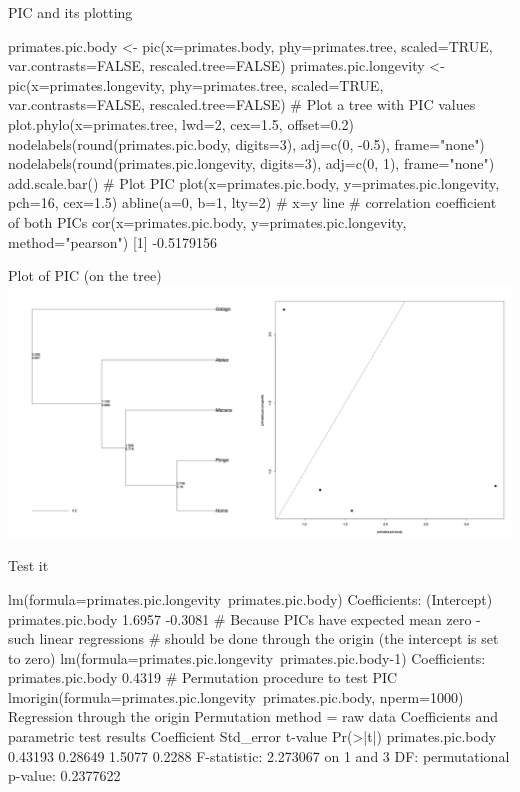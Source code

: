 \documentclass[compress, ucs, xelatex, 11pt, xcolor=svgnames,
  hyperref={
    bookmarks=true,
    unicode=true,
    colorlinks=true,
    pdftitle={Molecular data in R},
    plainpages=false,
    pdfauthor={Vojtech Zeisek},
    pdfsubject={Course about phylogeny and evolution in R},
    pdfcreator={XeLaTeX},
    pdfkeywords={R, evolution, phylogeny, molecular data},
    linkcolor=Tomato,
    anchorcolor=SaddleBrown,
    citecolor=Goldenrod,
    filecolor=DarkMagenta,
    menucolor=Sienna,
    urlcolor=DarkTurquoise,
    pdftex},
  url={hyphens, lowtilde} %
  ]{beamer}
\begin{document}
\begin{frame}[fragile]{PIC and its plotting}
  \begin{spluscode}
    primates.pic.body <- pic(x=primates.body, phy=primates.tree,
      scaled=TRUE, var.contrasts=FALSE, rescaled.tree=FALSE)
    primates.pic.longevity <- pic(x=primates.longevity, phy=primates.tree,
      scaled=TRUE, var.contrasts=FALSE, rescaled.tree=FALSE)
    # Plot a tree with PIC values
    plot.phylo(x=primates.tree, lwd=2, cex=1.5, offset=0.2)
    nodelabels(round(primates.pic.body, digits=3), adj=c(0, -0.5),
      frame="none")
    nodelabels(round(primates.pic.longevity, digits=3), adj=c(0, 1),
      frame="none")
    add.scale.bar()
    # Plot PIC
    plot(x=primates.pic.body, y=primates.pic.longevity, pch=16, cex=1.5)
    abline(a=0, b=1, lty=2) # x=y line
    # correlation coefficient of both PICs
    cor(x=primates.pic.body, y=primates.pic.longevity, method="pearson")
    [1] -0.5179156
  \end{spluscode}
\end{frame}

\begin{frame}{Plot of PIC (on the tree)}
\includegraphics[width=\textwidth]{pic.png}
\end{frame}

\begin{frame}[fragile]{Test it}
  \begin{spluscode}
    lm(formula=primates.pic.longevity~primates.pic.body)
    Coefficients:
      (Intercept)  primates.pic.body
           1.6957            -0.3081
    # Because PICs have expected mean zero - such linear regressions
    # should be done through the origin (the intercept is set to zero)
    lm(formula=primates.pic.longevity~primates.pic.body-1)
    Coefficients:
    primates.pic.body
               0.4319
    # Permutation procedure to test PIC
    lmorigin(formula=primates.pic.longevity~primates.pic.body, nperm=1000)
    Regression through the origin
    Permutation method = raw data
    Coefficients and parametric test results
                       Coefficient Std_error t-value Pr(>|t|)
    primates.pic.body     0.43193   0.28649  1.5077   0.2288
    F-statistic: 2.273067 on 1 and 3 DF:
      permutational p-value: 0.2377622
  \end{spluscode}
\end{frame}
\end{document}
